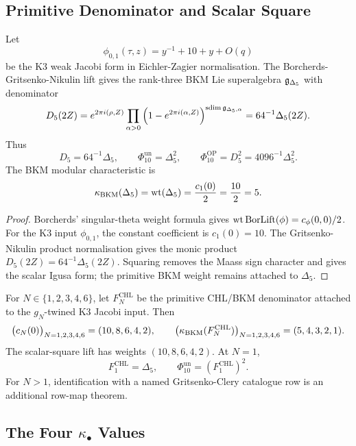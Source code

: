 \subsection{Primitive Denominator and Scalar Square}
\label{spk3e:primitive-denominator}

\begin{theorem}[Primitive Borcherds denominator at \(N=1\)]
\label{spk3e:thm-delta5-denominator}
Let
\[
 \phi_{0,1}(\tau,z)=y^{-1}+10+y+O(q)
\]
be the K3 weak Jacobi form in Eichler-Zagier normalisation. The
Borcherds-Gritsenko-Nikulin lift gives the rank-three BKM Lie
superalgebra \(\mathfrak{g}_{\Delta_5}\) with denominator
\[
 D_5(2Z)
 =
 e^{2\pi i(\rho,Z)}
 \prod_{\alpha>0}
 \left(1-e^{2\pi i(\alpha,Z)}\right)^{
 \operatorname{sdim}\mathfrak{g}_{\Delta_5,\alpha}}
 =
 64^{-1}\Delta_5(2Z).
\]
Thus
\[
 D_5=64^{-1}\Delta_5,\qquad
 \Phi_{10}^{\mathrm{un}}=\Delta_5^2,\qquad
 \Phi_{10}^{\mathrm{OP}}=D_5^2=4096^{-1}\Delta_5^2.
\]
The BKM modular characteristic is
\[
 \kappa_{\mathrm{BKM}}(\Delta_5)
 =
 \operatorname{wt}(\Delta_5)
 =
 \frac{c_1(0)}{2}
 =
 \frac{10}{2}
 =
 5.
\]
\end{theorem}

\begin{proof}
Borcherds' singular-theta weight formula gives
\(\operatorname{wt}\mathrm{BorLift}(\phi)=c_\phi(0,0)/2\). For the K3 input
\(\phi_{0,1}\), the constant coefficient is \(c_1(0)=10\). The
Gritsenko-Nikulin product normalisation gives the monic product
\(D_5(2Z)=64^{-1}\Delta_5(2Z)\). Squaring removes the Maass sign character
and gives the scalar Igusa form; the primitive BKM weight remains attached
to \(\Delta_5\).
\end{proof}

\begin{corollary}
\label{spk3e:cor-chl-constants}
For \(N\in\{1,2,3,4,6\}\), let \(F_N^{\mathrm{CHL}}\) be the primitive
CHL/BKM denominator attached to the \(g_N\)-twined K3 Jacobi input. Then
\[
 \bigl(c_N(0)\bigr)_{N=1,2,3,4,6}
 =
 (10,8,6,4,2),
 \qquad
 \bigl(\kappa_{\mathrm{BKM}}(F_N^{\mathrm{CHL}})\bigr)_{N=1,2,3,4,6}
 =
 (5,4,3,2,1).
\]
The scalar-square lift has weights \((10,8,6,4,2)\). At \(N=1\),
\[
 F_1^{\mathrm{CHL}}=\Delta_5,\qquad
 \Phi_{10}^{\mathrm{un}}=(F_1^{\mathrm{CHL}})^2.
\]
For \(N>1\), identification with a named Gritsenko-Clery catalogue row is
an additional row-map theorem.
\end{corollary}

\subsection{The Four \texorpdfstring{$\kappa_\bullet$}{subscripted invariant} Values}
\label{spk3e:four-invariant-values}

